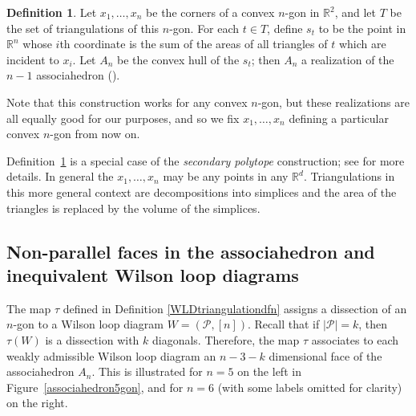 \documentclass[11pt]{article}
\newcommand{\cP}{\mathcal{P}}
\theoremstyle{remark}
\theoremstyle{definition}
\newtheorem{dfn}[thm]{Definition}
\begin{document}
\begin{dfn}\label{def:secondary polytope}
  Let $x_1, \ldots, x_n$ be the corners of a convex $n$-gon in $\mathbb{R}^2$, and let $T$ be the set of triangulations of this $n$-gon.  For each $t\in T$, define $s_t$ to be the point in $\mathbb{R}^n$ whose $i$th coordinate is the sum of the areas of all triangles of $t$ which are incident to $x_i$.  Let $A_n$ be the convex hull of the $s_t$; then $A_n$ a realization of the $n-1$ associahedron (\cite[Example 9.11]{Ziegler}).
\end{dfn}
Note that this construction works for any convex $n$-gon, but these realizations are all equally good for our purposes, and so we fix $x_1, \ldots, x_n$ defining a particular convex $n$-gon from now on.


Definition~\ref{def:secondary polytope} is a special case of the {\em secondary polytope} construction; see \cite[Definition 9.9]{Ziegler} for more details.  In general the $x_1, \ldots, x_n$ may be any points in any $\mathbb{R}^d$.  Triangulations in this more general context are decompositions into simplices and the area of the triangles is replaced by the volume of the simplices.  




\subsection{Non-parallel faces in the associahedron and inequivalent Wilson loop diagrams}\label{sec associahedron results}

The map $\tau$ defined in Definition \ref{WLDtriangulationdfn} assigns a dissection of an $n$-gon to a Wilson loop diagram $W = (\cP, [n])$. Recall that if $|\cP| = k$, then $\tau(W)$ is a dissection with $k$ diagonals. Therefore, the map $\tau$ associates to each weakly admissible Wilson loop diagram an $n-3 - k$ dimensional face of the associahedron $A_n$. This is illustrated for $n=5$ on the left in Figure~\ref{associahedron5gon}, and for $n=6$ (with some labels omitted for clarity) on the right.
\end{document}
